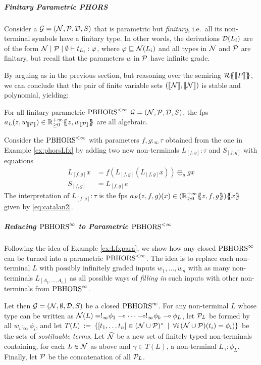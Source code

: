 \subparagraph*{Finitary Parametric PHORS}
Consider a $\mathcal{G}=(\mathcal{N}, \mathcal{P},\mathcal{D},S)$ that is parametric but \emph{finitary}, i.e.~all its non-terminal symbols have a finitary type. In other words, the derivations $\mathcal{D}(L_i)$ are of the form $\mathcal{N}\mid \mathcal{P}\mid \emptyset \vdash t_{L_i}:\varphi$, where $\varphi\sqsubseteq \mathcal{N}(L_i)$ and all types in $\mathcal{N}$ and $\mathcal{P}$ are finitary, but recall that the parameters $w$ in $\mathcal{P}$ have infinite grade. 

By arguing as in the previous section, but reasoning over the semiring ${\mathcal{R}}\{\!\!\{\llbracket P\rrbracket\}\!\!\}$, we can conclude that the pair of finite variable sets $(\llbracket\mathcal{N}\rrbracket,\llbracket\mathcal{N}\rrbracket)$ is stable and polynomial, yielding:

\begin{proposition}
For all finitary parametric $\text{PBHORS}^{<\infty}$ $\mathcal{G}=(\mathcal{N}, \mathcal{P},\mathcal{D}, S)$, the fps $a_L(z,w_{\llbracket\mathcal{P}\rrbracket})\in {\mathbb{R}^{+\infty}_{\geq 0}}\{\!\!\{z,w_{\llbracket\mathcal{P}\rrbracket}\}\!\!\}$ are all algebraic. 
\end{proposition}

\begin{example}\label{ex:Lfxpara}
Consider the $\text{PBHORS}^{<\infty}$ with parameters $f,g:_\infty\tau$ obtained from the one in Example \ref{ex:phorsLfx} by adding two new non-terminals
 $L_{[f,g]}:\tau$ and $S_{[f,g]}$ with equations 
\begin{align*}
L_{[f,g]}x&= f(L_{[f,g]}(L_{[f,g]}x))\oplus_a gx\\
S_{[f,g]}&= L_{[f,g]}e
\end{align*}
The interpretation of $L_{[f,g]}:\tau$ is the fps $a_{F}(z,f,g)(x)\in \fps{(\fps{\Rinf}{z,f,g})}{x}$ given by \eqref{eq:catalan2}.
\end{example}


\subparagraph*{Reducing $\text{PBHORS}^{\infty}$ to Parametric $\text{PBHORS}^{<\infty}$}
Following the idea of Example \ref{ex:Lfxpara}, we show how any closed $\text{PBHORS}^{\infty}$ can be turned into a parametric $\text{PBHORS}^{<\infty}$. 
The idea is to replace each non-terminal $L$ with possibly infinitely graded inputs $w_1,\dots, w_n$ with as many non-terminals $L_{[A_1,\dots,A_n]}$ as all possible ways of \emph{filling in} such inputs with other non-terminals from $\text{PBHORS}^{\infty}$. 

Let then $\mathcal{G}=(\mathcal{N},\emptyset, \mathcal{D},S)$ be a closed $\text{PBHORS}^{\infty}$. 
For any non-terminal $L$ whose type can be written as $\mathcal{N}(L)=!_\infty \phi_1\multimap\dots\multimap !_\infty\phi_k\multimap \phi_L$,
let $\mathcal{P}_L$ be formed by all $w_i:_\infty\phi_i$, and let $T(L) \: := \: \{[t_1, \dots t_n] \in (\mathcal{N}\cup\mathcal{P})^* \: \mid \: \forall i \, (\mathcal{N} \cup \mathcal{P}) (t_i) = \phi_i)  \}$ be the sets of \emph{sostituable terms}.
Let $\widetilde{\mathcal{N}}$ be a new set of finitely typed non-terminals containing, for each $L\in \mathcal{N}$ as above and $\gamma\in T(L)$, a non-terminal $\tilde{L}_\gamma:\phi_L$.
Finally, let $\mathcal{P}$ be the concatenation of all $\mathcal{P}_L$.

